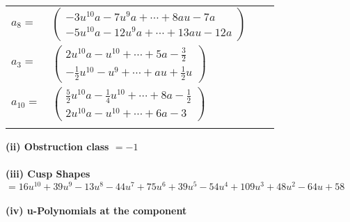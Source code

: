 \documentclass[1p]{elsarticle_modified}
\theoremstyle{definition}
\begin{document}
\begin{tabular}{m{7pt} m{180pt} m{7pt} m{180pt} }
\flushright $a_{8}=$&$\begin{pmatrix}-3 u^{10} a-7 u^9 a+\cdots+8 a u-7 a\\-5 u^{10} a-12 u^9 a+\cdots+13 a u-12 a\end{pmatrix}$ \\
\flushright $a_{3}=$&$\begin{pmatrix}2 u^{10} a- u^{10}+\cdots+5 a-\frac{3}{2}\\-\frac{1}{2} u^{10}- u^9+\cdots+a u+\frac{1}{2} u\end{pmatrix}$ \\
\flushright $a_{10}=$&$\begin{pmatrix}\frac{5}{2} u^{10} a-\frac{1}{4} u^{10}+\cdots+8 a-\frac{1}{2}\\2 u^{10} a- u^{10}+\cdots+6 a-3\end{pmatrix}$\\&\end{tabular}
\flushleft \textbf{(ii) Obstruction class $= -1$}\\~\\
\flushleft \textbf{(iii) Cusp Shapes $= 16 u^{10}+39 u^9-13 u^8-44 u^7+75 u^6+39 u^5-54 u^4+109 u^3+48 u^2-64 u+58$}\\~\\
\newpage\renewcommand{\arraystretch}{1}
\flushleft \textbf{(iv) u-Polynomials at the component}\newline \\
\end{document}
